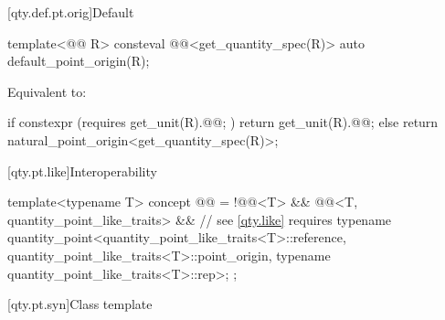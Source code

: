 [qty.def.pt.orig]{Default}

\begin{itemdecl}
template<@@ R>
consteval @@<get_quantity_spec(R{})> auto default_point_origin(R);
\end{itemdecl}

\begin{itemdescr}
\pnum
\effects
Equivalent to:
\begin{codeblock}
if constexpr (requires { get_unit(R{}).@@; })
  return get_unit(R{}).@@;
else
  return natural_point_origin<get_quantity_spec(R{})>;
\end{codeblock}
\end{itemdescr}

[qty.pt.like]{Interoperability}

\begin{itemdecl}
template<typename T>
concept @@ =
  !@@<T> &&
  @@<T, quantity_point_like_traits> &&  // see \ref{qty.like}
  requires {
    typename quantity_point<quantity_point_like_traits<T>::reference,
                            quantity_point_like_traits<T>::point_origin,
                            typename quantity_point_like_traits<T>::rep>;
  };
\end{itemdecl}

[qty.pt.syn]{Class template }

